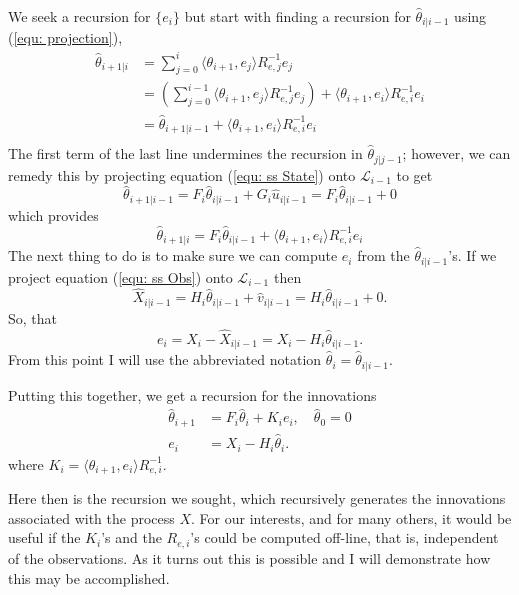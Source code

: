 \documentclass[12pt]{amsart}
\begin{document}
We seek a recursion for $\{e_i\}$ but start with finding a recursion for $\hat{\theta}_{i|i-1}$ using (\ref{equ: projection}),
\begin{align*}
\hat{\theta}_{i+1|i} &= \sum_{j=0}^i \langle \theta_{i+1}, e_j \rangle R^{-1}_{e,j} e_j\\
&= \left(\sum_{j=0}^{i-1} \langle \theta_{i+1}, e_j \rangle R^{-1}_{e,j} e_j\right) + \langle \theta_{i+1}, e_i \rangle R^{-1}_{e,i} e_i\\
& = \hat{\theta}_{i+1|i-1} + \langle \theta_{i+1}, e_i \rangle R^{-1}_{e,i} e_i\\
\end{align*}
The first term of the last line undermines the recursion in $\hat{\theta}_{j|j-1}$; however, we can remedy this by projecting equation (\ref{equ: ss State}) onto $\mathcal{L}_{i-1}$ to get
$$\hat{\theta}_{i+1|i-1} = F_i\hat{\theta}_{i|i-1} +G_i\hat{u}_{i|i-1} = F_i\hat{\theta}_{i|i-1} + 0$$
which provides
$$\hat{\theta}_{i+1|i} = F_i\hat{\theta}_{i|i-1} + \langle \theta_{i+1}, e_i \rangle R^{-1}_{e,i} e_i$$
The next thing to do is to make sure we can compute $e_i$ from the $\hat{\theta}_{i|i-1}$'s. If we project equation (\ref{equ: ss Obs}) onto $\mathcal{L}_{i-1}$ then 
\begin{equation}
\hat{X}_{i|i-1} = H_i\hat{\theta}_{i|i-1} + \hat{v}_{i|i-1} = H_i\hat{\theta}_{i|i-1} + 0.\label{equ: X hat}
\end{equation}
So, that
$$e_i = X_i - \hat{X}_{i|i-1} = X_i - H_i\hat{\theta}_{i|i-1}.$$ 
From this point I will use the abbreviated notation $\hat{\theta}_i = \hat{\theta}_{i|i-1}$.

Putting this together, we get a recursion for the innovations
\begin{subequations}
\begin{align}
\label{equ: theta hat} \hat{\theta}_{i+1} &= F_i\hat{\theta}_{i} + K_ie_i, \quad \hat{\theta}_0 = 0\\
\label{equ: innov} e_i &= X_i - H_i \hat{\theta}_{i}.
\end{align}
\end{subequations}
where $K_i = \langle \theta_{i+1}, e_i \rangle R^{-1}_{e,i}$. 

Here then is the recursion we sought, which recursively generates the innovations associated with the process $X$. For our interests, and for many others, it would be useful if the $K_i$'s and the $R_{e,i}$'s could be computed off-line, that is, independent of the observations. As it turns out this is possible and I will demonstrate how this may be accomplished.
\end{document}
